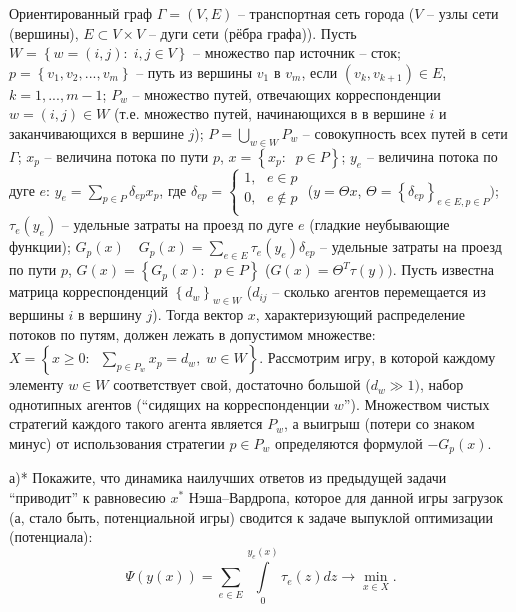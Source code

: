 \begin{problem} 
Ориентированный граф $\Gamma =\left( {V,E} \right)$ -- транспортная сеть 
города ($V$ -- узлы сети (вершины), $E\subset V\times V$ -- дуги сети (рёбра 
графа)). Пусть $W=\left\{ {w=\left( {i,j} \right):\;i,j\in V} \right\}$ -- 
множество пар источник -- сток; $p=\left\{ {v_1 ,v_2 ,...,v_m } \right\}$ -- 
путь из вершины $v_1 $ в $v_m $, если $\left( {v_k ,v_{k+1} } \right)\in E$, 
$k=1,...,m-1$; $P_w $ -- множество путей, отвечающих корреспонденции $w = (i,j)\in 
W$ (т.е. множество путей, начинающихся в в вершине $i$ и заканчивающихся в вершине $j$); $P=\bigcup\nolimits_{w\in W} {P_w } $ -- совокупность всех путей в сети 
$\Gamma $; $x_p $ -- величина потока по пути $p$, $x=\left\{ {x_p :\;\;p\in 
P} \right\}$; $y_e $ -- величина потока по дуге $e$: $y_e =\sum\limits_{p\in 
P} {\delta _{ep} x_p } $, где $\delta _{ep} =\left\{ {\begin{array}{l}
 1,\mbox{ }e\in p \\ 
 0,\mbox{ }e\notin p \\ 
 \end{array}} \right.$ ($y=\Theta x$, $\Theta =\left\{ {\delta _{ep} } 
\right\}_{e\in E,p\in P} )$; $\tau _e \left( {y_e } \right)$ -- удельные 
затраты на проезд по дуге $e$ (гладкие неубывающие функции); $G_p \left( x 
\right) \quad G_p \left( x \right)=\sum\limits_{e\in E} {\tau _e \left( {y_e } 
\right)\delta _{ep} } $ -- удельные затраты на проезд по пути $p$, $G\left( 
x \right)=\left\{ {G_p \left( x \right):\;\;p\in P} \right\}$ ($G\left( x 
\right)=\Theta ^T\tau \left( y \right))$. Пусть известна матрица 
корреспонденций $\left\{ {d_w } \right\}_{w\in W} $ ($d_{ij}$ -- сколько агентов перемещается из вершины $i$ в вершину $j$). Тогда вектор $x$, 
характеризующий распределение потоков по путям, должен лежать в допустимом множестве: 
$X=\left\{ {x\ge 0:\;\;\sum\limits_{p\in P_w } {x_p } =d_w ,\;w\in W} 
\right\}$. Рассмотрим игру, в которой каждому элементу $w\in W$ 
соответствует свой, достаточно большой ($d_w \gg 1)$, набор однотипных 
агентов (``сидящих на корреспонденции $w$''). Множеством чистых стратегий 
каждого такого агента является $P_w $, а выигрыш (потери со знаком минус) от 
использования стратегии $p\in P_w $ определяются формулой $-G_p \left( x 
\right)$.

а)* Покажите, что динамика наилучших ответов из предыдущей задачи 
``приводит'' к равновесию $x^\ast $ Нэша--Вардропа, которое для данной игры 
загрузок (а, стало быть, потенциальной игры) сводится к задаче выпуклой 
оптимизации (потенциала):
\[
\Psi \left( {y\left( x \right)} \right)=\sum\limits_{e\in E} 
{\int\limits_0^{y_e \left( x \right)} {\tau _e \left( z \right)dz} } \to 
\mathop {\min }\limits_{x\in X} .
\]


\end{problem}
